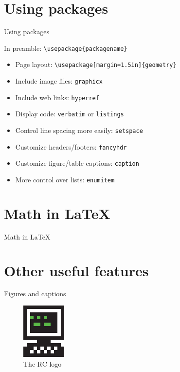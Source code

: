 \documentclass[xcolor={dvipsnames}]{beamer}
\begin{document}
\section{Using packages}
\begin{frame}{Using packages}
\begin{block}{}
\centering
In preamble: \texttt{\textbackslash usepackage\{packagename\}}
\end{block}
\begin{itemize}
\item Page layout: \texttt{\textbackslash usepackage[margin=1.5in]\{geometry\}}
\item Include image files: \texttt{graphicx}
\item Include web links: \texttt{hyperref} 
\item Display code: \texttt{verbatim} or \texttt{listings}
\item Control line spacing more easily: \texttt{setspace}
\item Customize headers/footers: \texttt{fancyhdr}
\item Customize figure/table captions: \texttt{caption}
\item More control over lists: \texttt{enumitem}
\end{itemize}
\end{frame}

\section{Math in \LaTeX}
\begin{frame}{Math in \LaTeX}
\end{frame}

\section{Other useful features}
\begin{frame}{Figures and captions}

\begin{figure}
\includegraphics[scale=1.5]{rc-logo}
\caption{The RC logo}
\end{figure}
\end{frame}
\end{document}
